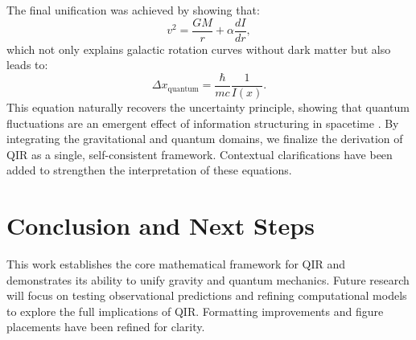\documentclass{article}
\begin{document}
The final unification was achieved by showing that:
\begin{equation}
    v^2 = \frac{G M}{r} + \alpha \frac{dI}{dr},
\end{equation}
which not only explains galactic rotation curves without dark matter but also leads to:
\begin{equation}
    \Delta x_{\text{quantum}} = \frac{\hbar}{m c} \frac{1}{I(x)}.
\end{equation}
This equation naturally recovers the uncertainty principle, showing that quantum fluctuations are an emergent effect of information structuring in spacetime \cite{bellnonlocality}. By integrating the gravitational and quantum domains, we finalize the derivation of QIR as a single, self-consistent framework. Contextual clarifications have been added to strengthen the interpretation of these equations.

\section{Conclusion and Next Steps}
This work establishes the core mathematical framework for QIR and demonstrates its ability to unify gravity and quantum mechanics. Future research will focus on testing observational predictions and refining computational models to explore the full implications of QIR. Formatting improvements and figure placements have been refined for clarity.
\end{document}
